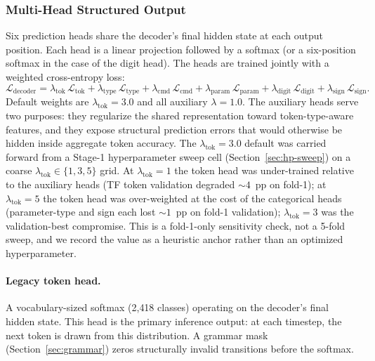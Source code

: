 \documentclass[sensors,article,submit,moreauthors,pdftex]{Definitions/mdpi}
\begin{document}
\subsubsection{Multi-Head Structured Output}
\label{sec:multihead}

Six prediction heads share the decoder's final hidden state at each output position. Each head is a linear projection followed by a softmax (or a six-position softmax in the case of the digit head). The heads are trained jointly with a weighted cross-entropy loss:
\begin{equation*}
\mathcal{L}_{\text{decoder}} =
    \lambda_{\text{tok}}\,\mathcal{L}_{\text{tok}} +
    \lambda_{\text{type}}\,\mathcal{L}_{\text{type}} +
    \lambda_{\text{cmd}}\,\mathcal{L}_{\text{cmd}} +
    \lambda_{\text{param}}\,\mathcal{L}_{\text{param}} +
    \lambda_{\text{digit}}\,\mathcal{L}_{\text{digit}} +
    \lambda_{\text{sign}}\,\mathcal{L}_{\text{sign}}.
\end{equation*}
Default weights are $\lambda_{\text{tok}}=3.0$ and all auxiliary $\lambda=1.0$. The auxiliary heads serve two purposes: they regularize the shared representation toward token-type-aware features, and they expose structural prediction errors that would otherwise be hidden inside aggregate token accuracy. The $\lambda_{\text{tok}}=3.0$ default was carried forward from a Stage-1 hyperparameter sweep cell (Section~\ref{sec:hp-sweep}) on a coarse $\lambda_{\text{tok}}\!\in\!\{1, 3, 5\}$ grid. At $\lambda_{\text{tok}}=1$ the token head was under-trained relative to the auxiliary heads (TF token validation degraded $\sim\!4$~pp on fold-1); at $\lambda_{\text{tok}}=5$ the token head was over-weighted at the cost of the categorical heads (parameter-type and sign each lost $\sim\!1$~pp on fold-1 validation); $\lambda_{\text{tok}}=3$ was the validation-best compromise. This is a fold-1-only sensitivity check, not a 5-fold sweep, and we record the value as a heuristic anchor rather than an optimized hyperparameter.

\paragraph{Legacy token head.} A vocabulary-sized softmax (2{,}418 classes) operating on the decoder's final hidden state. This head is the primary inference output: at each timestep, the next token is drawn from this distribution. A grammar mask (Section~\ref{sec:grammar}) zeros structurally invalid transitions before the softmax.
\end{document}
